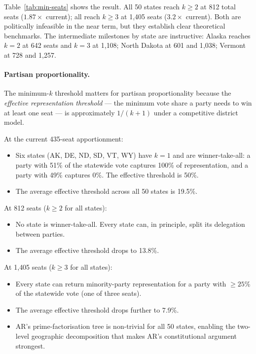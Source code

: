 \noindent Table~\ref{tab:min-seats} shows the result.
All 50 states reach $k \geq 2$ at 812 total seats ($1.87\times$ current);
all reach $k \geq 3$ at 1{,}405 seats ($3.2\times$ current).
Both are politically infeasible in the near term, but they establish clear
theoretical benchmarks.
The intermediate milestones by state are instructive:
Alaska reaches $k = 2$ at 642 seats and $k = 3$ at 1{,}108;
North Dakota at 601 and 1{,}038;
Vermont at 728 and 1{,}257.

\paragraph{Partisan proportionality.}
The minimum-$k$ threshold matters for partisan proportionality because
the \emph{effective representation threshold} --- the minimum vote share
a party needs to win at least one seat --- is approximately $1/(k+1)$
under a competitive district model.

At the current 435-seat apportionment:
\begin{itemize}
\item Six states (AK, DE, ND, SD, VT, WY) have $k = 1$ and are
  winner-take-all: a party with 51\% of the statewide vote captures
  100\% of representation, and a party with 49\% captures 0\%.
  The effective threshold is 50\%.
\item The average effective threshold across all 50 states is 19.5\%.
\end{itemize}

At 812 seats ($k \geq 2$ for all states):
\begin{itemize}
\item No state is winner-take-all.
  Every state can, in principle, split its delegation between parties.
\item The average effective threshold drops to 13.8\%.
\end{itemize}

At 1{,}405 seats ($k \geq 3$ for all states):
\begin{itemize}
\item Every state can return minority-party representation for a party
  with $\geq 25$\% of the statewide vote (one of three seats).
\item The average effective threshold drops further to 7.9\%.
\item AR's prime-factorisation tree is non-trivial for all 50 states,
  enabling the two-level geographic decomposition that makes AR's
  constitutional argument strongest.
\end{itemize}

